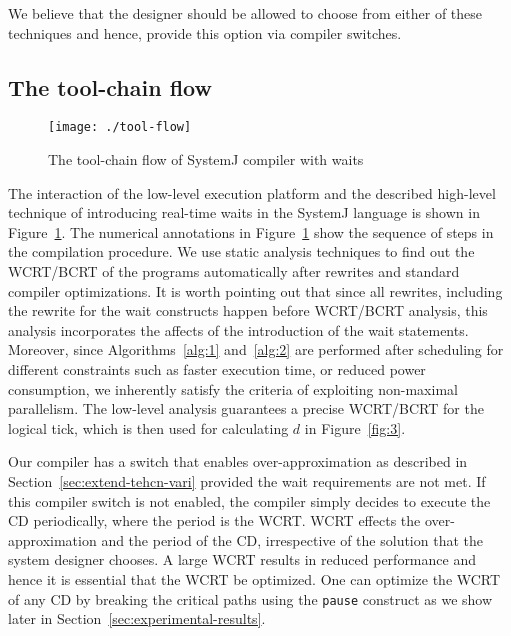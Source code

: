We believe that the designer should be allowed to choose from either of
these techniques and hence, provide this option via compiler switches.

\subsection{The tool-chain flow}
\label{sec:tool-chain-flow}

\begin{figure}[t!]
  \centering
  \texttt{[image: ./tool-flow]}
  \caption{The tool-chain flow of SystemJ compiler with waits}
  \label{fig:4}
\end{figure}

The interaction of the low-level execution platform and the described
high-level technique of introducing real-time waits in the SystemJ
language is shown in Figure~\ref{fig:4}. The numerical annotations in
Figure~\ref{fig:4} show the sequence of steps in the compilation
procedure. We use static analysis techniques to find out the WCRT/BCRT
of the programs automatically after rewrites and standard compiler
optimizations. %
It is worth pointing out that since all rewrites, including the rewrite
for the wait constructs happen before WCRT/BCRT analysis, this analysis
incorporates the affects of the introduction of the wait
statements. Moreover, since Algorithms~\ref{alg:1} and~\ref{alg:2} are
performed after scheduling for different constraints such as faster
execution time, or reduced power consumption, we inherently satisfy the
criteria of exploiting non-maximal parallelism. The low-level analysis
guarantees a precise WCRT/BCRT for the logical tick, which is then used
for calculating $d$ in Figure~\ref{fig:3}.

Our compiler has a switch that enables over-appro\-ximation as described
in Section~\ref{sec:extend-tehcn-vari} provided the wait requirements
are not met. If this compiler switch is not enabled, the compiler simply
decides to execute the CD periodically, where the period is the
WCRT. WCRT effects the over-approximation and the period of the CD,
irrespective of the solution that the system designer chooses. A large
WCRT results in reduced performance and hence it is essential that the
WCRT be optimized. One can optimize the WCRT of any CD by breaking the
critical paths using the \texttt{pause} construct as we show later in
Section~\ref{sec:experimental-results}.

